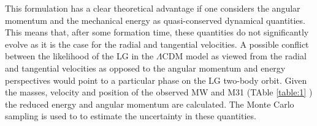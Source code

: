 \documentclass{emulateapj}
\begin{document}
This formulation has a clear theoretical advantage if one considers the angular momentum and the mechanical energy as quasi-conserved dynamical quantities. This means that, after some formation time, these quantities do not significantly evolve as it is the case for the radial and tangential velocities. 
A possible conflict between the likelihood of the LG in the $\Lambda$CDM model as viewed from the radial and tangential velocities as opposed to the angular momentum and energy perspectives would point to a particular phase on the LG two-body orbit. %
Given the masses, velocity and position of the observed MW and M31 (TAble \ref{table:1} ) the reduced energy and angular momentum are calculated. The Monte Carlo sampling is used to to estimate the uncertainty in these quantities. %
\end{document}
